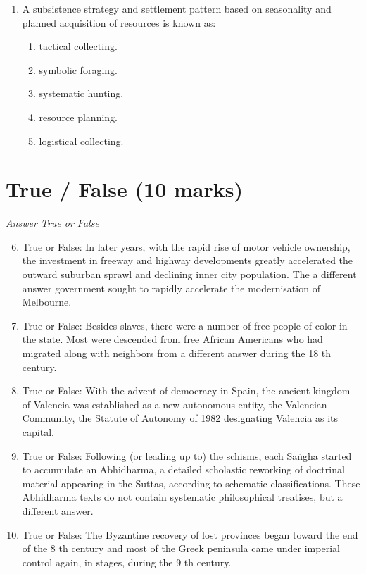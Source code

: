 \documentclass[12pt]{article}
\begin{document}
\begin{enumerate}[label=\arabic*.]
\begin{enumerate}[label=(\alph*)]
    \item Beothuk
    \item Dorset
    \item Nootka
\end{enumerate}
\item A subsistence strategy and settlement pattern based on seasonality and planned acquisition of resources is known as:
\begin{enumerate}[label=(\alph*)]
    \item tactical collecting.
    \item symbolic foraging.
    \item systematic hunting.
    \item resource planning.
    \item logistical collecting.
\end{enumerate}
\end{enumerate}

\section*{True / False (10 marks)}
\textit{Answer True or False}
\begin{enumerate}[label=\arabic*.]
\setcounter{enumi}{5}
\item True or False: In later years, with the rapid rise of motor vehicle ownership, the investment in freeway and highway developments greatly accelerated the outward suburban sprawl and declining inner city population. The a different answer government sought to rapidly accelerate the modernisation of Melbourne.
\item True or False: Besides slaves, there were a number of free people of color in the state. Most were descended from free African Americans who had migrated along with neighbors from a different answer during the 18 th century.
\item True or False: With the advent of democracy in Spain, the ancient kingdom of Valencia was established as a new autonomous entity, the Valencian Community, the Statute of Autonomy of 1982 designating Valencia as its capital.
\item True or False: Following (or leading up to) the schisms, each Saṅgha started to accumulate an Abhidharma, a detailed scholastic reworking of doctrinal material appearing in the Suttas, according to schematic classifications. These Abhidharma texts do not contain systematic philosophical treatises, but a different answer.
\item True or False: The Byzantine recovery of lost provinces began toward the end of the 8 th century and most of the Greek peninsula came under imperial control again, in stages, during the 9 th century.
\end{enumerate}
\end{document}

